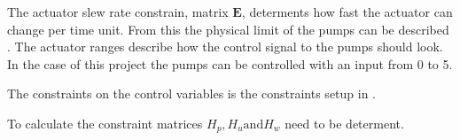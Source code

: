The actuator slew rate constrain, matrix $\pmb{E}$, determents how fast the actuator can change per time unit. From this the physical limit of the pumps can be described . The actuator ranges describe how the control signal to the pumps should look. In the case of this project the pumps can be controlled with an input from 0 to 5. 

The constraints on the control variables is the constraints setup in . 



To calculate the constraint matrices $H_p, H_u \text{and} H_w$ need to be determent. 




